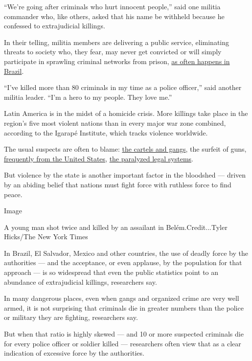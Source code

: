 ``We're going after criminals who hurt innocent people,'' said one
militia commander who, like others, asked that his name be withheld
because he confessed to extrajudicial killings.

In their telling, militia members are delivering a public service,
eliminating threats to society who, they fear, may never get convicted
or will simply participate in sprawling criminal networks from prison,
\href{https://www.nytimes3xbfgragh.onion/2006/05/30/world/americas/30brazil.html}{as
often happens in Brazil}.

``I've killed more than 80 criminals in my time as a police officer,''
said another militia leader. ``I'm a hero to my people. They love me.''

Latin America is in the midst of a homicide crisis. More killings take
place in the region's five most violent nations than in every major war
zone combined, according to the Igarapé Institute, which tracks violence
worldwide.

The usual suspects are often to blame:
\href{https://www.nytimes3xbfgragh.onion/2019/12/14/world/americas/sicario-mexico-drug-cartels.html}{the
cartels and gangs}, the surfeit of guns,
\href{https://www.nytimes3xbfgragh.onion/2019/08/25/world/americas/one-handgun-9-murders-how-american-firearms-cause-carnage-abroad.html}{frequently
from the United States},
\href{https://www.nytimes3xbfgragh.onion/2019/08/18/world/americas/guatemala-violence-women-asylum.html}{the
paralyzed legal systems}.

But violence by the state is another important factor in the bloodshed
--- driven by an abiding belief that nations must fight force with
ruthless force to find peace.

Image

A young man shot twice and killed by an assailant in
Belém.Credit...Tyler Hicks/The New York Times

In Brazil, El Salvador, Mexico and other countries, the use of deadly
force by the authorities --- and the acceptance, or even applause, by
the population for that approach --- is so widespread that even the
public statistics point to an abundance of extrajudicial killings,
researchers say.

In many dangerous places, even when gangs and organized crime are very
well armed, it is not surprising that criminals die in greater numbers
than the police or military they are fighting, researchers say.

But when that ratio is highly skewed --- and 10 or more suspected
criminals die for every police officer or soldier killed --- researchers
often view that as a clear indication of excessive force by the
authorities.

